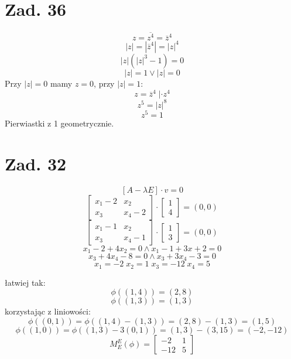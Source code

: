 \documentclass[a4paper,fleqn]{article}
\begin{document}
	\section*{Zad. 36}
	\[ z= \overline{z^4} = \overline z ^ 4\]
	\[ |z| = |\overline z ^ 4 |= |z|^4 \]
	\[ |z|(|z|^3 - 1) = 0 \]
	\[ |z| = 1 \lor |z| = 0 \]
	Przy $|z|=0$ mamy  $z=0$, przy $|z|=1$:
	\[ z= \overline z ^ 4 \; |\cdot z^4 \]
	\[ z^5 = |z|^8 \]
	\[ z^5 = 1 \]
	Pierwiastki z 1 geometrycznie. %

	\section*{Zad. 32}
	\[ [A-\lambda E] \cdot v = 0 \]
	\[ \begin{bmatrix}
		x_1 - 2 & x_2 \\
		x_3 & x_4 - 2 \end{bmatrix}
		\cdot \begin{bmatrix} 1 \\ 4 \end{bmatrix}
		= (0,0) \]
	\[ \begin{bmatrix}
		x_1 - 1 & x_2 \\
		x_3 & x_4 - 1 \end{bmatrix}
		\cdot \begin{bmatrix} 1 \\ 3 \end{bmatrix}
		= (0,0) \]
	\[ x_1 -2 + 4x_2 = 0 \land x_1 - 1 + 3x+2 = 0 \]
	\[ x_3 + 4x_4 - 8 = 0 \land x_3 + 3 x_4 -3 =0 \]
	\[ x_1 = -2 \; x_2 = 1 \; x_3 = -12 \; x_4 = 5 \]

	łatwiej tak:
	\[ \phi((1,4)) = (2,8) \]
	\[ \phi((1,3)) = (1,3) \]
	korzystając z liniowości:
	\[ \phi((0,1)) = \phi((1,4)-(1,3)) = (2,8)-(1,3) = (1,5) \]
	\[ \phi((1,0)) = \phi((1,3)-3(0,1)) =  (1,3)-(3,15) = (-2,-12) \]
	\[ M_E^E (\phi) = \begin{bmatrix} -2 & 1 \\ -12&5 \end{bmatrix} \]
\end{document}

